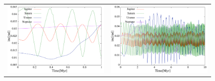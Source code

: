 \documentclass[11pt,a4paper,oneside,onecolumn]{jarticle}
\begin{document}
\begin{figure}[H]
\begin{tabular}{cc}
\begin{minipage}[t]{0.45\hsize}
\centering
\includegraphics[width=7.6cm]{./image/move5Myr_inc_1Myr.pdf}
\end{minipage} &
\begin{minipage}[t]{0.45\hsize}
\centering
\includegraphics[width=7.6cm]{./image/move5Myr_inc_10Myr.pdf}
\end{minipage}
%
\end{tabular}
\caption{\label{}}
\end{figure}
\end{document}
